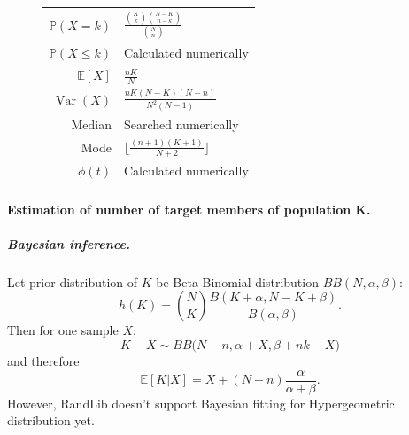 \documentclass[a4paper,11pt]{article}
\theoremstyle{plain}
\theoremstyle{definition}
\newcommand{\ME}{\mathbb{E}}
\newcommand{\MP}{\mathbb{P}}
\newcommand{\Var}{\operatorname{Var}}
\begin{document}
\begin{figure}[!htb]
\begin{minipage}{0.4\textwidth}
\begin{tabular}{| r | l |}
					\hline
					$\MP(X = k)$ & $ \frac{\binom{K}{k}\binom{N-K}{n-k}  }{\binom{N}{n}}   $ \\
					\hline
					$\MP(X \leq k)$ & Calculated numerically \\
					\hline
					$\ME[X]$ & $ \frac{nK}{N}$ \\
					\hline
					$\Var(X)$ & $ \frac{nK(N-K)(N-n)}{N^2(N-1)} $ \\
					\hline
					Median & Searched numerically \\
					\hline
					Mode & $ \Big\lfloor  \frac{(n+1)(K+1)}{N+2} \Big\rfloor  $ \\
					\hline
					$\phi(t)$ & Calculated numerically \\
					\hline
				\end{tabular}
			\end{minipage}
		\end{figure}
		
	\paragraph{Estimation of number of target members of population K.}
	\subparagraph{Bayesian inference.}
	Let prior distribution of $K$ be Beta-Binomial distribution $BB(N, \alpha, \beta)$:
	\[
	h(K) = \binom{N}{K} \frac{B(K + \alpha, N - K + \beta)}{B(\alpha, \beta)}.
	\]
	Then for one sample $X$:
    \[
    K - X \sim BB\big(N - n, \alpha + X, \beta + nk - X \big)
    \]
    and therefore
    \[ 
    \mathbb{E}[K|X] = X + (N - n) \frac{\alpha}{\alpha + \beta}.
    \]
    However, RandLib doesn't support Bayesian fitting for Hypergeometric distribution yet.
    
		
	\pagebreak
\end{document}
